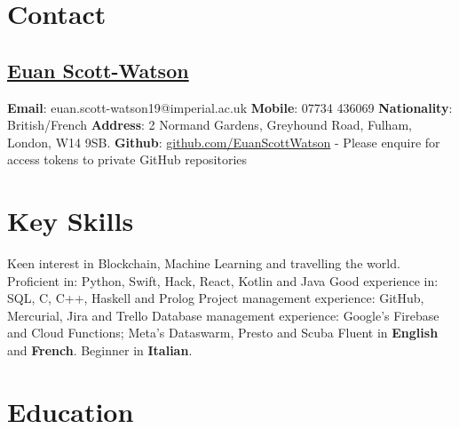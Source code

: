 \documentclass{my_cv}
\begin{document}
\section{Contact}
\subsection{\href{https://www.linkedin.com/in/euan-scott-watson-4211951b7/}{Euan Scott-Watson}}
\textbf{Email}: euan.scott-watson19@imperial.ac.uk\newline
\textbf{Mobile}: 07734 436069\newline
\textbf{Nationality}: British/French\newline
\textbf{Address}: 2 Normand Gardens, Greyhound Road, Fulham, London, W14 9SB.\newline
\textbf{Github}: \href{https://github.com/EuanScottWatson}{github.com/EuanScottWatson} - Please enquire for access tokens to private GitHub repositories

\section{Key Skills}
Keen interest in Blockchain, Machine Learning and travelling the world. \newline
Proficient in: Python, Swift, Hack, React, Kotlin and Java \newline
Good experience in: SQL, C, C++, Haskell and Prolog \newline
Project management experience: GitHub, Mercurial, Jira and Trello \newline
Database management experience: Google's Firebase and Cloud Functions; Meta's Dataswarm, Presto and Scuba \newline
Fluent in \textbf{English} and \textbf{French}. Beginner in \textbf{Italian}.

\section{Education}
\end{document}
